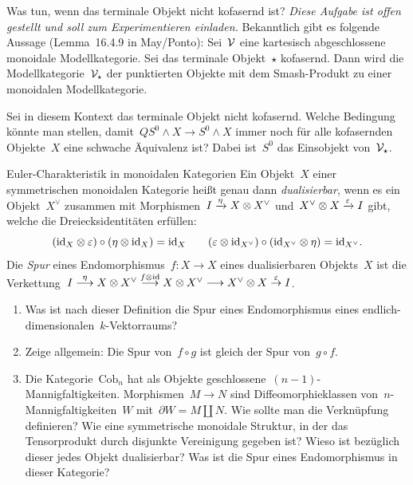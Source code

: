 \documentclass{uebblatt}
\begin{document}
\enlargethispage{1em}

\begin{aufgabe}{Was tun, wenn das terminale Objekt nicht kofasernd ist?}
\emph{Diese Aufgabe ist offen gestellt und soll zum Experimentieren einladen.}
Bekanntlich gibt es folgende Aussage (Lemma~16.4.9 in May/Ponto): Sei~$\mathcal{V}$ eine
kartesisch abgeschlossene monoidale Modellkategorie. Sei das terminale
Objekt~$\star$ kofasernd. Dann wird die Modellkategorie~$\mathcal{V}_\star$ der punktierten
Objekte mit dem Smash-Produkt zu einer monoidalen Modellkategorie.

Sei in diesem Kontext das terminale Objekt nicht kofasernd. Welche Bedingung könnte man
stellen, damit~$QS^0 \wedge X \to S^0 \wedge X$ immer noch für alle kofasernden
Objekte~$X$ eine schwache Äquivalenz ist? Dabei ist~$S^0$ das Einsobjekt
von~$\mathcal{V}_\star$.
\end{aufgabe}

\begin{aufgabe}{Euler-Charakteristik in monoidalen Kategorien}
Ein Objekt~$X$ einer symmetrischen monoidalen Kategorie heißt genau dann
\emph{dualisierbar}, wenn es ein Objekt~$X^\vee$ zusammen mit Morphismen~$I
\xrightarrow{\eta} X \otimes X^\vee$ und~$X^\vee \otimes X \xrightarrow{\varepsilon} I$ gibt,
welche die Dreiecksidentitäten erfüllen:
\[ (\mathrm{id}_X \otimes \varepsilon) \circ (\eta \otimes \mathrm{id}_X) = \mathrm{id}_X \qquad
  (\varepsilon \otimes \mathrm{id}_{X^\vee}) \circ (\mathrm{id}_{X^\vee} \otimes \eta) = \mathrm{id}_{X^\vee}. \]
Die \emph{Spur} eines Endomorphismus~$f : X \to X$ eines dualisierbaren
Objekts~$X$ ist die Verkettung~$I \stackrel{\eta}{\longrightarrow} X \otimes X^\vee
\stackrel{f \otimes \mathrm{id}}{\longrightarrow} X \otimes X^\vee \longrightarrow X^\vee \otimes X
\stackrel{\varepsilon}{\to} I$.
\begin{enumerate}
\item Was ist nach dieser Definition die Spur eines Endomorphismus eines
endlich-dimensionalen~$k$-Vektorraums?
\item Zeige allgemein: Die Spur von~$f \circ g$ ist gleich der Spur von~$g
\circ f$.
\item Die Kategorie~$\mathrm{Cob}_n$ hat als Objekte
geschlossene~$(n-1)$-Mannigfaltigkeiten. Morphismen~$M \to N$
sind Diffeomorphieklassen von~$n$-Mannigfaltigkeiten~$W$ mit~$\partial W = M
\amalg N$. Wie sollte man die Verknüpfung definieren? Wie eine symmetrische
monoidale Struktur, in der das Tensorprodukt durch disjunkte Vereinigung
gegeben ist? Wieso ist bezüglich dieser jedes Objekt dualisierbar? Was
ist die Spur eines Endomorphismus in dieser Kategorie?
\end{enumerate}
\end{aufgabe}
\end{document}
